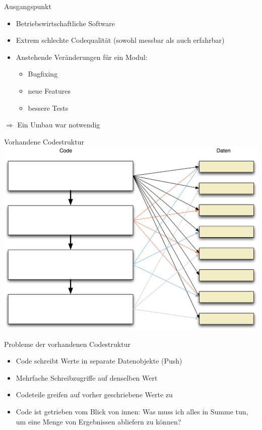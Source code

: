\begin{frame}[fragile]{Ausgangspunkt}
\begin{itemize}
\item Betriebswirtschaftliche Software
\item Extrem schlechte Codequalität (sowohl messbar als auch erfahrbar)
\item Anstehende Veränderungen für ein Modul:
\begin{itemize}
\item Bugfixing
\item neue Features
\item bessere Tests
\end{itemize}
\end{itemize}

$\Rightarrow$ Ein Umbau war notwendig
\end{frame}

\begin{frame}[fragile]{Vorhandene Codestruktur}
\includegraphics[width=.8 \paperwidth]{Codestruktur.png}
\end{frame}

\begin{frame}[fragile]{Probleme der vorhandenen Codestruktur}
\begin{itemize}
\item Code schreibt Werte in separate Datenobjekte (\glqq Push\grqq{})
\item Mehrfache Schreibzugriffe auf denselben Wert
\item Codeteile greifen auf vorher geschriebene Werte zu
\item Code ist getrieben vom Blick von innen: Was muss ich alles in Summe tun, um eine Menge von Ergebnissen abliefern zu können?
\end{itemize}
\end{frame}



